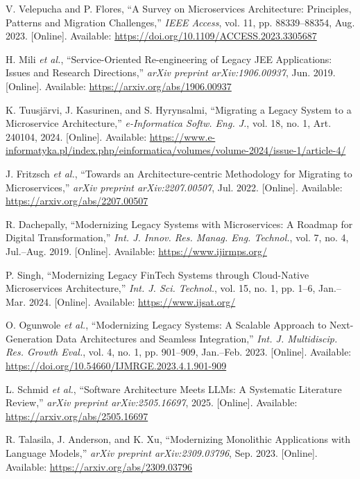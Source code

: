 \documentclass[12pt]{article}
\begin{document}
\begin{thebibliography}{99}
V. Velepucha and P. Flores, “A Survey on Microservices Architecture: Principles, Patterns and Migration Challenges,” \textit{IEEE Access}, vol. 11, pp. 88339–88354, Aug. 2023. [Online]. Available: \url{https://doi.org/10.1109/ACCESS.2023.3305687}

H. Mili \textit{et al.}, “Service-Oriented Re-engineering of Legacy JEE Applications: Issues and Research Directions,” \textit{arXiv preprint arXiv:1906.00937}, Jun. 2019. [Online]. Available: \url{https://arxiv.org/abs/1906.00937}

K. Tuusjärvi, J. Kasurinen, and S. Hyrynsalmi, “Migrating a Legacy System to a Microservice Architecture,” \textit{e-Informatica Softw. Eng. J.}, vol. 18, no. 1, Art. 240104, 2024. [Online]. Available: \url{https://www.e-informatyka.pl/index.php/einformatica/volumes/volume-2024/issue-1/article-4/}

J. Fritzsch \textit{et al.}, “Towards an Architecture-centric Methodology for Migrating to Microservices,” \textit{arXiv preprint arXiv:2207.00507}, Jul. 2022. [Online]. Available: \url{https://arxiv.org/abs/2207.00507}

R. Dachepally, “Modernizing Legacy Systems with Microservices: A Roadmap for Digital Transformation,” \textit{Int. J. Innov. Res. Manag. Eng. Technol.}, vol. 7, no. 4, Jul.–Aug. 2019. [Online]. Available: \url{https://www.ijirmps.org/}

P. Singh, “Modernizing Legacy FinTech Systems through Cloud-Native Microservices Architecture,” \textit{Int. J. Sci. Technol.}, vol. 15, no. 1, pp. 1–6, Jan.–Mar. 2024. [Online]. Available: \url{https://www.ijsat.org/}

O. Ogunwole \textit{et al.}, “Modernizing Legacy Systems: A Scalable Approach to Next-Generation Data Architectures and Seamless Integration,” \textit{Int. J. Multidiscip. Res. Growth Eval.}, vol. 4, no. 1, pp. 901–909, Jan.–Feb. 2023. [Online]. Available: \url{https://doi.org/10.54660/IJMRGE.2023.4.1.901-909}

L. Schmid \textit{et al.}, “Software Architecture Meets LLMs: A Systematic Literature Review,” \textit{arXiv preprint arXiv:2505.16697}, 2025. [Online]. Available: \url{https://arxiv.org/abs/2505.16697}

R. Talasila, J. Anderson, and K. Xu, “Modernizing Monolithic Applications with Language Models,” \textit{arXiv preprint arXiv:2309.03796}, Sep. 2023. [Online]. Available: \url{https://arxiv.org/abs/2309.03796}


\end{thebibliography}
\end{document}
